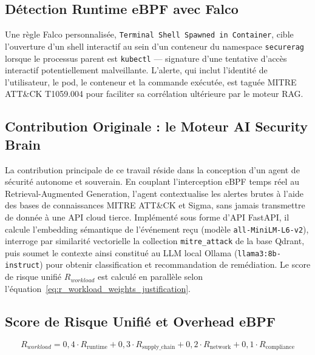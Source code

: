 \subsection{Détection Runtime eBPF avec Falco}

Une règle Falco personnalisée, \texttt{Terminal Shell Spawned in Container}, cible l'ouverture d'un shell interactif au sein d'un conteneur du namespace \texttt{securerag} lorsque le processus parent est \texttt{kubectl} — signature d'une tentative d'accès interactif potentiellement malveillante. L'alerte, qui inclut l'identité de l'utilisateur, le pod, le conteneur et la commande exécutée, est taguée MITRE ATT\&CK T1059.004 pour faciliter sa corrélation ultérieure par le moteur RAG.

\subsection{Contribution Originale : le Moteur AI Security Brain}

La contribution principale de ce travail réside dans la conception d'un agent de sécurité autonome et souverain. En couplant l'interception eBPF temps réel au Retrieval-Augmented Generation, l'agent contextualise les alertes brutes à l'aide des bases de connaissances MITRE ATT\&CK et Sigma, sans jamais transmettre de donnée à une API cloud tierce. Implémenté sous forme d'API FastAPI, il calcule l'embedding sémantique de l'événement reçu (modèle \texttt{all-MiniLM-L6-v2}), interroge par similarité vectorielle la collection \texttt{mitre\_attack} de la base Qdrant, puis soumet le contexte ainsi constitué au LLM local Ollama (\texttt{llama3:8b-instruct}) pour obtenir classification et recommandation de remédiation. Le score de risque unifié $R_{workload}$ est calculé en parallèle selon l'équation~\ref{eq:r_workload_weights_justification}.

\subsection{Score de Risque Unifié et Overhead eBPF}

\begin{equation}
R_{workload} = 0{,}4 \cdot R_{\text{runtime}} + 0{,}3 \cdot R_{\text{supply\_chain}} + 0{,}2 \cdot R_{\text{network}} + 0{,}1 \cdot R_{\text{compliance}}
\label{eq:r_workload_weights_justification}
\end{equation}

